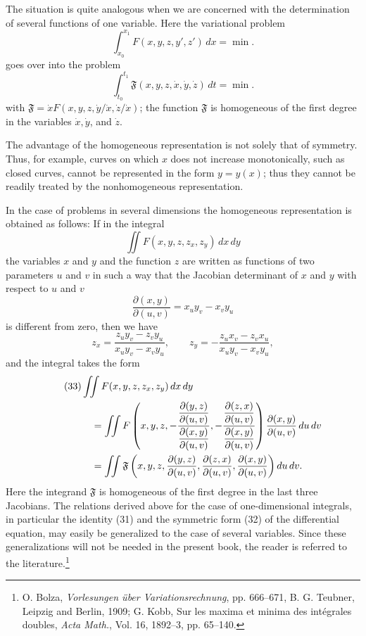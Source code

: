 The situation is quite analogous when we are concerned with the determination of several functions of one variable. Here the variational problem
\[
\int_{x_0}^{x_1}F(x,y,z,y',z')\,dx=\min.
\]
goes over into the problem
\[
\int_{t_0}^{t_1}\mathfrak F(x,y,z,\dot x,\dot y,\dot z)\,dt=\min.
\]
with $\mathfrak F=\dot xF(x,y,z,\dot y/\dot x,\dot z/\dot x)$; the function $\mathfrak F$ is homogeneous of the first degree in the variables $\dot x,\dot y$, and $\dot z$.

The advantage of the homogeneous representation is not solely that of symmetry. Thus, for example, curves on which $x$ does not increase monotonically, such as closed curves, cannot be represented in the form $y=y(x)$; thus they cannot be readily treated by the nonhomogeneous representation.

In the case of problems in several dimensions the homogeneous representation is obtained as follows: If in the integral
\[
\iint F(x,y,z,z_x,z_y)\,dx\,dy
\]
the variables $x$ and $y$ and the function $z$ are written as functions of two parameters $u$ and $v$ in such a way that the Jacobian determinant of $x$ and $y$ with respect to $u$ and $v$
\[
\frac{\partial(x,y)}{\partial(u,v)}=x_uy_v-x_vy_u
\]
is different from zero, then we have
\[
z_x=\frac{z_uy_v-z_vy_u}{x_uy_v-x_vy_u},
\qquad
z_y=-\frac{z_ux_v-z_vx_u}{x_uy_v-x_vy_u},
\]
and the integral takes the form
\begin{align}\tag{33}
&\iint F(x,y,z,z_x,z_y)\,dx\,dy\notag\\
&\quad=\iint F\left(
 x,y,z,
 -\frac{\dfrac{\partial(y,z)}{\partial(u,v)}}{\dfrac{\partial(x,y)}{\partial(u,v)}},
 -\frac{\dfrac{\partial(z,x)}{\partial(u,v)}}{\dfrac{\partial(x,y)}{\partial(u,v)}}
 \right)
 \frac{\partial(x,y)}{\partial(u,v)}\,du\,dv\notag\\
&\quad=\iint \mathfrak F\left(
 x,y,z,
 \frac{\partial(y,z)}{\partial(u,v)},
 \frac{\partial(z,x)}{\partial(u,v)},
 \frac{\partial(x,y)}{\partial(u,v)}
 \right)du\,dv.
\end{align}
Here the integrand $\mathfrak F$ is homogeneous of the first degree in the last three Jacobians. The relations derived above for the case of one-dimensional integrals, in particular the identity (31) and the symmetric form (32) of the differential equation, may easily be generalized to the case of several variables. Since these generalizations will not be needed in the present book, the reader is referred to the literature.\footnote{O. Bolza, \emph{Vorlesungen über Variationsrechnung}, pp. 666--671, B. G. Teubner, Leipzig and Berlin, 1909; G. Kobb, Sur les maxima et minima des intégrales doubles, \emph{Acta Math.}, Vol. 16, 1892--3, pp. 65--140.}

